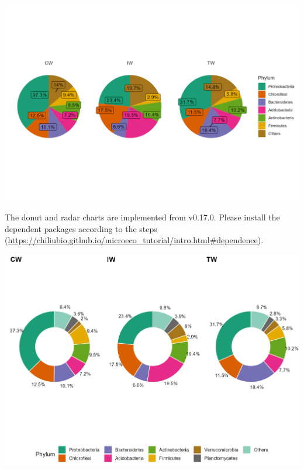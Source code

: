 \documentclass[
]{book}
\newenvironment{Shaded}{\begin{snugshade}}{\end{snugshade}}
\newcommand{\AttributeTok}[1]{\textcolor[rgb]{0.77,0.63,0.00}{#1}}
\newcommand{\ConstantTok}[1]{\textcolor[rgb]{0.00,0.00,0.00}{#1}}
\newcommand{\DecValTok}[1]{\textcolor[rgb]{0.00,0.00,0.81}{#1}}
\newcommand{\FunctionTok}[1]{\textcolor[rgb]{0.00,0.00,0.00}{#1}}
\newcommand{\NormalTok}[1]{#1}
\newcommand{\OtherTok}[1]{\textcolor[rgb]{0.56,0.35,0.01}{#1}}
\newcommand{\SpecialCharTok}[1]{\textcolor[rgb]{0.00,0.00,0.00}{#1}}
\newcommand{\StringTok}[1]{\textcolor[rgb]{0.31,0.60,0.02}{#1}}
\begin{document}
\begin{center}\includegraphics[width=600px]{Images/trans_abund_pie} \end{center}

The donut and radar charts are implemented from v0.17.0.
Please install the dependent packages according to the steps (\url{https://chiliubio.github.io/microeco_tutorial/intro.html\#dependence}).

\begin{Shaded}
\end{Shaded}

\begin{center}\includegraphics[width=650px]{Images/trans_abund_donut} \end{center}
\end{document}
